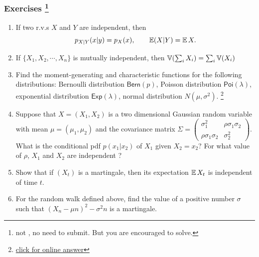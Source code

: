 \documentclass[english,10pt,handout]{beamer}
\begin{document}
\begin{frame}
\frametitle{Exercises \footnote{not \hw,  no need to submit. But you are encouraged to  solve.}}

\begin{enumerate}



\item 
If two r.v.s  $X$ and $Y$ are independent, then
\[p_{X|Y}(x|y) = p_X(x),\qquad \operatorname{\mathbb E}(X|Y) = \operatorname{\mathbb E} X.\]



\item
If $\{X_1,X_2,\cdots,X_n\}$ is mutually independent, then
$\operatorname{\mathbb{V} } (\sum_i X_i) = \sum_i \operatorname{\mathbb{V} }(X_i)$

\item Find the moment-generating and characteristic functions
for the following distributions:
Bernoulli distribution $\mathsf{Bern}(p)$, Poisson distribution $\mathsf{Poi}(\lambda)$, 
exponential distribution $\mathsf{Exp}(\lambda)$,  normal distribution $N(\mu,\sigma^2)$.
 \footnote{\href{https://en.wikipedia.org/wiki/Characteristic_function_(probability_theory)}{click for online answer}} 

\item Suppose that 
$X=(X_1,X_2)$ is a two dimensional Gaussian random variable
with mean $\mu=(\mu_1,\mu_2)$ and the covariance matrix
$\Sigma=\left(\begin{smallmatrix}
\sigma^2_1&\rho\sigma_1\sigma_2\\ \rho\sigma_1\sigma_2&\sigma_2^2
\end{smallmatrix}\right )$.
What is the conditional pdf  $p(x_1|x_2)$ of $X_1$ given $X_2=x_2$?
For what value of $\rho$,  $X_1$ and $X_2$ are independent ?
%


\item Show that if $(X_t)$ is a martingale, then 
its expectation $\operatorname{\mathbb E} X_t$ is independent of time $t$. 
%
%
\item For the random walk defined above, find the value 
of a positive number $\sigma$
such that $(X_n-\mu n)^2 -\sigma^2 n $ is a martingale. 

\end{enumerate}
\end{frame}
\end{document}
